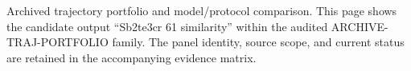 Archived trajectory portfolio and model/protocol comparison. This page shows the candidate output ``Sb2te3cr 61 similarity'' within the audited ARCHIVE-TRAJ-PORTFOLIO family. The panel identity, source scope, and current status are retained in the accompanying evidence matrix.
